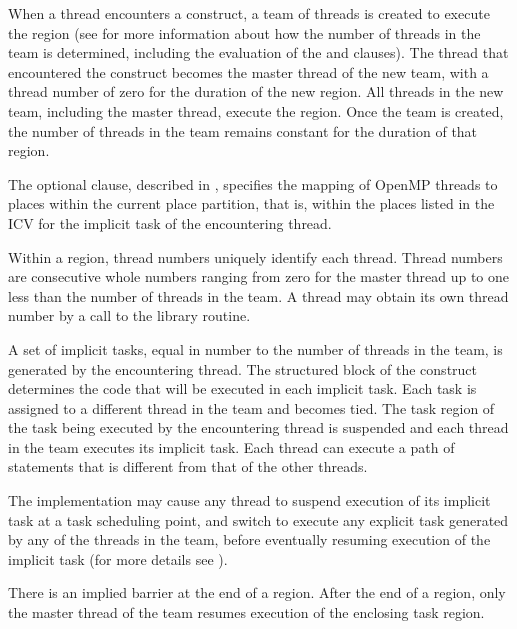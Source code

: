 \descr
When a thread encounters a  construct, a team of threads is created to
execute the  region (see
for more information about
how the number of threads in the team is determined, including the evaluation of the 
and  clauses). The thread that encountered the  construct
becomes the master thread of the new team, with a thread number of zero for the
duration of the new  region. All threads in the new team, including the
master thread, execute the region. Once the team is created, the number of threads in the
team remains constant for the duration of that  region.

The optional  clause, described in
, specifies the
mapping of OpenMP threads to places within the current place partition, that is, within
the places listed in the  ICV for the implicit task of the encountering
thread.

Within a  region, thread numbers uniquely identify each thread. Thread
numbers are consecutive whole numbers ranging from zero for the master thread up to
one less than the number of threads in the team. A thread may obtain its own thread
number by a call to the  library routine.

A set of implicit tasks, equal in number to the number of threads in the team, is
generated by the encountering thread. The structured block of the  construct
determines the code that will be executed in each implicit task. Each task is assigned to
a different thread in the team and becomes tied. The task region of the task being
executed by the encountering thread is suspended and each thread in the team executes
its implicit task. Each thread can execute a path of statements that is different from that
of the other threads.

The implementation may cause any thread to suspend execution of its implicit task at a
task scheduling point, and switch to execute any explicit task generated by any of the
threads in the team, before eventually resuming execution of the implicit task (for more
details see ).

There is an implied barrier at the end of a  region. After the end of a
 region, only the master thread of the team resumes execution of the
enclosing task region.

